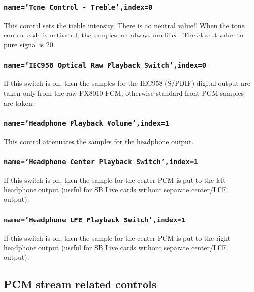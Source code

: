 \documentclass[a4paper,8pt,english]{sphinxmanual}
\begin{document}
\subsubsection{\texttt{name='Tone Control - Treble',index=0}}
\label{sound/cards/sb-live-mixer:name-tone-control-treble-index-0}
This control sets the treble intensity. There is no neutral value!!
When the tone control code is activated, the samples are always modified.
The closest value to pure signal is 20.


\subsubsection{\texttt{name='IEC958 Optical Raw Playback Switch',index=0}}
\label{sound/cards/sb-live-mixer:name-iec958-optical-raw-playback-switch-index-0}
If this switch is on, then the samples for the IEC958 (S/PDIF) digital
output are taken only from the raw FX8010 PCM, otherwise standard front
PCM samples are taken.


\subsubsection{\texttt{name='Headphone Playback Volume',index=1}}
\label{sound/cards/sb-live-mixer:name-headphone-playback-volume-index-1}
This control attenuates the samples for the headphone output.


\subsubsection{\texttt{name='Headphone Center Playback Switch',index=1}}
\label{sound/cards/sb-live-mixer:name-headphone-center-playback-switch-index-1}
If this switch is on, then the sample for the center PCM is put to the
left headphone output (useful for SB Live cards without separate center/LFE
output).


\subsubsection{\texttt{name='Headphone LFE Playback Switch',index=1}}
\label{sound/cards/sb-live-mixer:name-headphone-lfe-playback-switch-index-1}
If this switch is on, then the sample for the center PCM is put to the
right headphone output (useful for SB Live cards without separate center/LFE
output).


\subsection{PCM stream related controls}
\label{sound/cards/sb-live-mixer:pcm-stream-related-controls}
\end{document}
